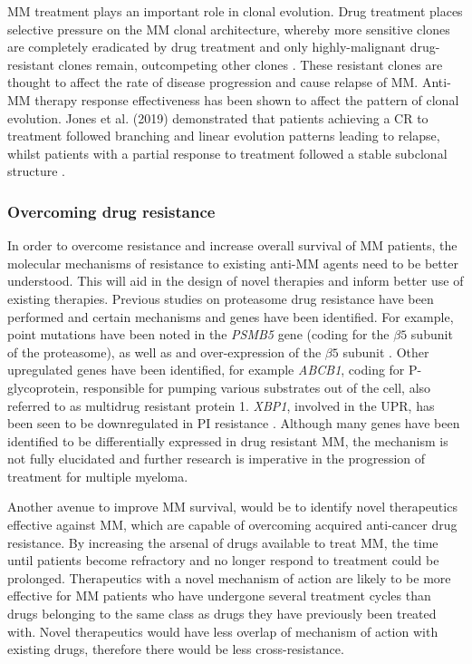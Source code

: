 MM treatment plays an important role in clonal evolution.
Drug treatment places selective pressure on the MM clonal architecture, whereby more sensitive clones are completely eradicated by drug treatment and only highly-malignant drug-resistant clones remain, outcompeting other clones \cite{furukawa2020molecular}.
These resistant clones are thought to affect the rate of disease progression and cause relapse of MM\@.
Anti-MM therapy response effectiveness has been shown to affect the pattern of clonal evolution.
Jones et al. (2019) demonstrated that patients achieving a CR to treatment followed branching and linear evolution patterns leading to relapse, whilst patients with a partial response to treatment followed a stable subclonal structure \cite{jones2019clonal}.



\subsubsection{Overcoming drug resistance}
In order to overcome resistance and increase overall survival of MM patients, the molecular mechanisms of resistance to existing anti-MM agents need to be better understood.
This  will aid in the design of novel therapies and inform better use of existing therapies.
Previous studies on proteasome drug resistance have been performed and certain mechanisms and genes have been identified.
For example, point mutations have been noted in the \textit{PSMB5} gene (coding for the $\beta5$ subunit of the proteasome), as well as and over-expression of the $\beta5$ subunit \cite{robak2018drug}.
Other upregulated genes have been identified, for example \textit{ABCB1}, coding for P-glycoprotein, responsible for pumping various substrates out of the cell, also referred to as multidrug resistant protein 1.
\textit{XBP1}, involved in the UPR, has been seen to be downregulated in PI resistance \cite{robak2018drug}.
Although many genes have been identified to be differentially expressed in drug resistant MM, the mechanism is not fully elucidated and further research is imperative in the progression of treatment for multiple myeloma.

Another avenue to improve MM survival, would be to identify novel therapeutics effective against MM, which are capable of overcoming acquired anti-cancer drug resistance.
By increasing the arsenal of drugs available to treat MM, the time until patients become refractory and no longer respond to treatment could be prolonged.
Therapeutics with a novel mechanism of action are likely to be more effective for MM patients who have undergone several treatment cycles than drugs belonging to the same class as drugs they have previously been treated with.
Novel therapeutics would have less overlap of mechanism of action with existing drugs, therefore there would be less cross-resistance.

